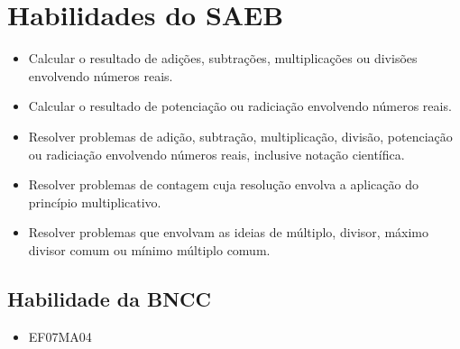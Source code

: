 \section*{Habilidades do SAEB }

\begin{itemize}
\item Calcular o resultado de adições, subtrações,
multiplicações ou divisões envolvendo números reais.
\item
  Calcular o resultado de potenciação ou radiciação envolvendo números
  reais.
\item
  Resolver problemas de adição, subtração, multiplicação, divisão,
  potenciação ou radiciação envolvendo números reais, inclusive notação
  científica.
\item
  Resolver problemas de contagem cuja resolução envolva a aplicação do
  princípio multiplicativo.
\item
  Resolver problemas que envolvam as ideias de múltiplo, divisor, máximo
  divisor comum ou mínimo múltiplo comum.
\end{itemize}

\subsection{Habilidade da BNCC }
\begin{itemize}
\item EF07MA04
\end{itemize}



